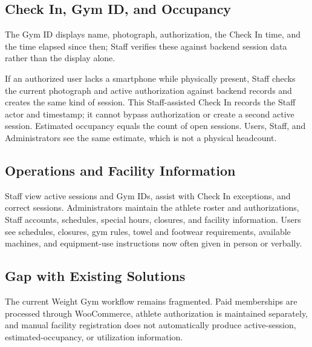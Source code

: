 \subsection{Check In, Gym ID, and Occupancy}

 The Gym ID displays name, photograph, authorization, the Check In time, and the time elapsed since then; Staff verifies these against backend session data rather than the display alone.

If an authorized user lacks a smartphone while physically present, Staff checks the current photograph and active authorization against backend records and creates the same kind of session. This Staff-assisted Check In records the Staff actor and timestamp; it cannot bypass authorization or create a second active session. Estimated occupancy equals the count of open sessions. Users, Staff, and Administrators see the same estimate, which is not a physical headcount.

\subsection{Operations and Facility Information}

Staff view active sessions and Gym IDs, assist with Check In exceptions, and correct sessions. Administrators maintain the athlete roster and authorizations, Staff accounts, schedules, special hours, closures, and facility information. Users see schedules, closures, gym rules, towel and footwear requirements, available machines, and equipment-use instructions now often given in person or verbally. 

\subsection{Gap with Existing Solutions}

The current Weight Gym workflow remains fragmented. Paid memberships are processed through WooCommerce, athlete authorization is maintained separately, and manual facility registration does not automatically produce active-session, estimated-occupancy, or utilization information.

